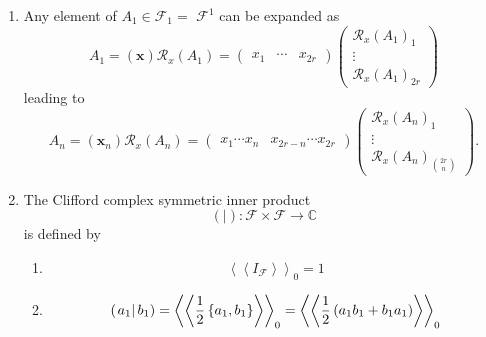 \documentclass[aps,preprint]{revtex4}
\begin{document}
\begin{enumerate}
\item Any element of $A_{1}\in \mathcal{F}_{1}=$ $\mathcal{F}^{1}$ can be
expanded as 
\begin{equation}
A_{1}=\left( \boldsymbol{x}\right) \mathcal{R}_{x}\left( A_{1}\right)
=\left( 
\begin{array}{ccc}
x_{1} & \cdots  & x_{2r}%
\end{array}%
\right) \left( 
\begin{array}{c}
\mathcal{R}_{x}\left( A_{1}\right) _{1} \\ 
\vdots  \\ 
\mathcal{R}_{x}\left( A_{1}\right) _{2r}%
\end{array}%
\right) 
\end{equation}%
leading to 
\begin{equation}
A_{n}=\left( \boldsymbol{x}_{n}\right) \mathcal{R}_{x}\left( A_{n}\right)
=\left( 
\begin{array}{cc}
x_{1}\cdots x_{n} & x_{2r-n}\cdots x_{2r}%
\end{array}%
\right) \left( 
\begin{array}{c}
\mathcal{R}_{x}\left( A_{n}\right) _{1} \\ 
\vdots  \\ 
\mathcal{R}_{x}\left( A_{n}\right) _{\binom{2r}{n}}%
\end{array}%
\right) .
\end{equation}

\item The Clifford complex symmetric inner product 
\begin{equation}
\left( \left. {}\right\vert \right) :\mathcal{F\times F}\rightarrow \mathbb{C%
}
\end{equation}%
is defined by

\begin{enumerate}
\item 
\begin{equation}
\left\langle \left\langle I_{\mathcal{F}}\right\rangle \right\rangle _{0}=1
\end{equation}

\item 
\begin{equation}
\left( \left. a_{1}\right\vert b_{1}\right) =\left\langle \left\langle \frac{%
1}{2}\left\{ a_{1},b_{1}\right\} \right\rangle \right\rangle
_{0}=\left\langle \left\langle \frac{1}{2}\left(
a_{1}b_{1}+b_{1}a_{1}\right) \right\rangle \right\rangle _{0}
\end{equation}


\end{enumerate}
\end{enumerate}
\end{document}
